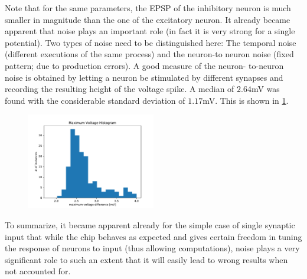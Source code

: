 \documentclass[a4paper,twocolumn]{article}
\begin{document}
Note that for the same parameters,  the EPSP of the inhibitory neuron is much
smaller in magnitude than the one of the excitatory neuron.
It already became apparent that noise plays an important role (in fact it is very
strong for a single potential).  Two types of noise need to be distinguished here:
The temporal noise (different executions of the same process) and the neuron-to
neuron noise (fixed pattern; due to production errors).  A good measure of the neuron-
to-neuron noise is obtained by letting a neuron be stimulated by different synapses
and recording the resulting height of the voltage spike.  A median of $2.64$mV was
found with the considerable standard deviation of $1.17$mV.  This is shown in
\ref{MaxVoltHisto}.
\begin{figure}
		\includegraphics[width=0.5\textwidth]{figures/histo_maxVolt.pdf}
		\label{MaxVoltHisto}
\end{figure}
To summarize,  it became apparent already for the simple case of single synaptic
input that while the chip behaves as expected and gives certain freedom in tuning
the response of neurons to input (thus allowing computations),  noise plays a very
significant role to such an extent that it will easily lead to wrong results when not
accounted for.
\end{document}
